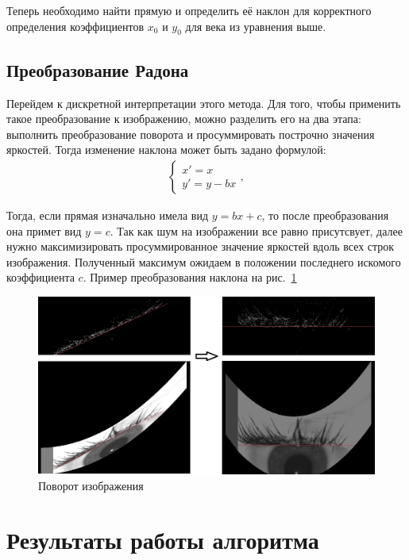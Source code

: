 \documentclass[12pt]{article} %
\begin{document}
Теперь необходимо найти прямую и определить её наклон для корректного определения коэффициентов $x_0$ и $y_0$ для века из уравнения выше.
 
\newpage
\subsection{Преобразование Радона}

Перейдем к дискретной интерпретации этого метода. Для того, чтобы применить такое преобразование к изображению, можно разделить его на два этапа: выполнить преобразование поворота и просуммировать построчно значения яркостей. Тогда изменение наклона может быть задано формулой:
\begin{gather}\label{nakl}
	\begin{cases}
		x' = x
		\\
		y' = y - bx
	\end{cases},
\end{gather}

Тогда, если прямая изначально имела вид $y=bx+c$, то после преобразования она примет вид $y = c$. Так как шум на изображении все равно присутсвует, далее нужно максимизировать просуммированное значение яркостей вдоль всех строк изображения. Полученный максимум ожидаем в положении последнего искомого коэффициента $c$. Пример преобразования наклона на рис.~\ref{fig:nakl}

\begin{figure}[h]
	
	\centering
	
	\includegraphics[width=0.8\linewidth]{nakl.jpg}
	
	\caption{Поворот изображения}
	
	\label{fig:nakl}
	
\end{figure}



\newpage
\section{Результаты работы алгоритма}
\end{document}
